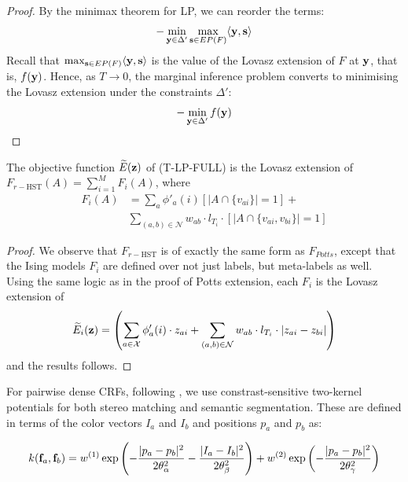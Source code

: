 {{{\begin{proof}
By the minimax theorem for LP, we can reorder the terms:
\begin{equation}
    - \min_{{\bf y} \in \Delta'} \max_{{\bf s} \in EP(F)} \langle {\bf y}, {\bf s} \rangle 
\end{equation}
Recall that $\max_{{\bf s} \in EP(F)} \langle {\bf y}, {\bf s} \rangle$ is the value of the Lovasz extension of $F$ at $\bf y$, that is, $f({\bf y})$. Hence, as $T \to 0$, the marginal inference problem converts to minimising the Lovasz extension under the constraints $\Delta'$:
\begin{equation}
    - \min_{{\bf y} \in \Delta'} f({\bf y}) 
\end{equation}
\end{proof}

{\proposition The objective function $\widetilde{E}({\bf z})$ of (T-LP-FULL) is the Lovasz extension of $F_{r-\textrm{HST}}(A) = \sum_{i = 1}^M F_i(A)$, where
\begin{align}
    F_i(A) &= \sum_a \phi'_{a}(i) [|A \cap \{v_{ai}\}| = 1] + \nonumber \\
           &\sum_{(a, b) \in {\mathcal N}} {w_{ab}} \cdot l_{T_i} \cdot [|A \cap \{v_{ai}, v_{bi}\}| = 1]
\end{align}
\begin{proof}
    We observe that $F_{r-\textrm{HST}}$ is of exactly the same form as
    $F_{Potts}$, except that the Ising models $F_i$ are defined over not just labels, but meta-labels as well. Using the same logic as in the proof of Potts extension, each $F_i$ is the Lovasz extension of 
        \begin{equation}
            \widetilde{E}_i({\bf z}) = \left( \sum_{a \in {\mathcal X}} \phi_a'(i) \cdot z_{ai} + \sum_{(a, b) \in {\mathcal N}} w_{ab} \cdot l_{T_i} \cdot |z_{ai} - z_{bi}| \right)
        \end{equation}
    and the results follows. 
\end{proof}


For pairwise dense CRFs, following \cite{koltun2011efficient}, we use constrast-sensitive two-kernel potentials for both stereo matching and semantic segmentation. These are defined in terms of the color vectors ${I}_a$ and ${I}_b$ and positions $p_a$ and $p_b$ as:

\begin{equation}
k({\bf f}_a, {\bf f}_b) = w^{(1)}\exp\left(- \frac{|p_a - p_b|^2}{2 \theta_{\alpha}^2} - \frac{|{I}_a - {I}_b|^2}{2 \theta_{\beta}^2}\right) + w^{(2)}\exp\left(- \frac{|p_a - p_b|^2}{2 \theta_{\gamma}^2}\right) 
\end{equation}

}}}}
